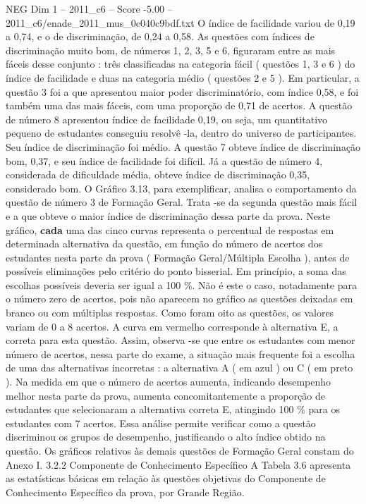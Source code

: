 \begin{textsample}{NEG Dim 1 – 2011\_c6 – Score -5.00 – 2011\_c6/enade\_2011\_mus\_0c040c9bdf.txt}
O índice de facilidade variou de 0,19 a 0,74, e o de discriminação, de 0,24 a 0,58.
As questões com índices de discriminação muito bom, de números 1, 2, 3, 5 e 6, figuraram entre as mais fáceis desse conjunto : três classificadas na categoria fácil ( questões 1, 3 e 6 ) do índice de facilidade e duas na categoria médio ( questões 2 e 5 ).
Em particular, a questão 3 foi a que apresentou maior poder discriminatório, com índice 0,58, e foi também uma das mais fáceis, com uma proporção de 0,71 de acertos.
A questão de número 8 apresentou índice de facilidade 0,19, ou seja, um quantitativo pequeno de estudantes conseguiu resolvê -la, dentro do universo de participantes.
Seu índice de discriminação foi médio.
A questão 7 obteve índice de discriminação bom, 0,37, e seu índice de facilidade foi difícil.
Já a questão de número 4, considerada de dificuldade média, obteve índice de discriminação 0,35, considerado bom.
O Gráfico 3.13, para exemplificar, analisa o comportamento da questão de número 3 de Formação Geral.
Trata -se da segunda questão mais fácil e a que obteve o maior índice de discriminação dessa parte da prova.
Neste gráfico, \textbf{cada} uma das cinco curvas representa o percentual de respostas em determinada alternativa da questão, em função do número de acertos dos estudantes nesta parte da prova ( Formação Geral/Múltipla Escolha ), antes de possíveis eliminações pelo critério do ponto bisserial.
Em princípio, a soma das escolhas possíveis deveria ser igual a 100 \%.
Não é este o caso, notadamente para o número zero de acertos, pois não aparecem no gráfico as questões deixadas em branco ou com múltiplas respostas.
Como foram oito as questões, os valores variam de 0 a 8 acertos.
A curva em vermelho corresponde à alternativa E, a correta para esta questão.
Assim, observa -se que entre os estudantes com menor número de acertos, nessa parte do exame, a situação mais frequente foi a escolha de uma das alternativas incorretas : a alternativa A ( em azul ) ou C ( em preto ).
Na medida em que o número de acertos aumenta, indicando desempenho melhor nesta parte da prova, aumenta concomitantemente a proporção de estudantes que selecionaram a alternativa correta E, atingindo 100 \% para os estudantes com 7 acertos.
Essa análise permite verificar como a questão discriminou os grupos de desempenho, justificando o alto índice obtido na questão.
Os gráficos relativos às demais questões de Formação Geral constam do Anexo I. 3.2.2 Componente de Conhecimento Específico A Tabela 3.6 apresenta as estatísticas básicas em relação às questões objetivas do Componente de Conhecimento Específico da prova, por Grande Região.

\end{textsample}
